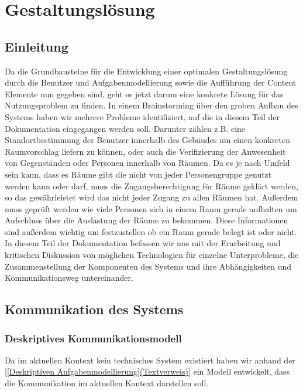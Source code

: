 \section{Gestaltungslösung}
\label{sec:Gestaltungslösung}

\subsection{Einleitung}
\label{sec:Gestaltungslösung Einleitung}

Da die Grundbausteine für die Entwicklung einer optimalen Gestaltungslösung
durch die Benutzer und Aufgabenmodellierung sowie die Aufführung der Content
Elemente nun gegeben sind, geht es jetzt darum eine konkrete Lösung für das
Nutzungsproblem zu finden.
In einem Brainstorming über den groben Aufbau des Systems haben wir mehrere
Probleme identifiziert, auf die in diesem Teil der Dokumentation eingegangen
werden soll. Darunter zählen z.B. eine Standortbestimmung der Benutzer
innerhalb des Gebäudes um einen konkreten Raumvorschlag liefern zu können,
oder auch die Verifizierung der Anwesenheit von Gegenständen oder Personen
innerhalb von Räumen. Da es je nach Umfeld sein kann, dass es Räume gibt die
nicht von jeder Personengruppe genutzt werden kann oder darf, muss die
Zugangsberechtigung für Räume geklärt werden, so das gewährleistet wird das
nicht jeder Zugang zu allen Räumen hat. Außerdem muss geprüft werden wie viele
Personen sich in einem Raum gerade aufhalten um Aufschluss über die Auslastung
der Räume zu bekommen. Diese Informationen sind außerdem wichtig um
festzustellen ob ein Raum gerade belegt ist oder nicht. In diesem Teil der
Dokumentation befassen wir uns mit der Erarbeitung und kritischen Diskussion
von möglichen Technologien für einzelne Unterprobleme, die Zusammenstellung der
Komponenten des Systems und ihre Abhängigkeiten und Kommunikationsweg
untereinander.

\subsection{Kommunikation des Systems}
\label{sec:Kommunikation des Systems}

\subsubsection{Deskriptives Kommunikationsmodell}
\label{sec:Deskriptives Kommunikationsmodell}

Da im aktuellen Kontext kein technisches System existiert haben wir anhand der
\ref{[Deskriptiven Aufgabenmodellierung](Textverweis)} ein Modell entwickelt,
dass die Kommunikation im aktuellen Kontext darstellen soll.

